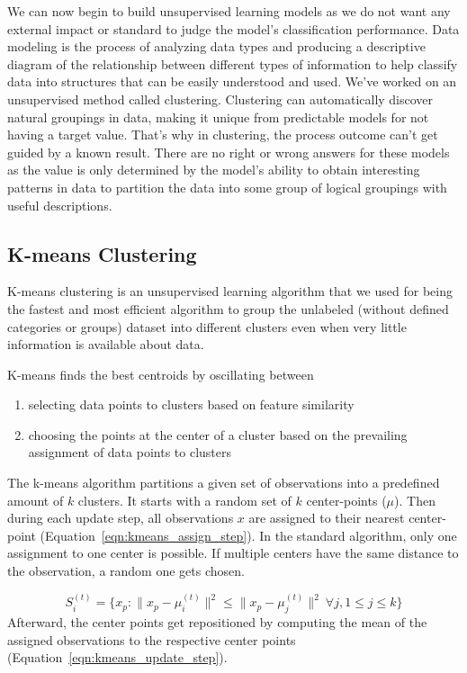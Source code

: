 \documentclass{swfuthesise}
\begin{document}
We can now begin to build unsupervised learning models as we do not want any external impact or standard to judge the model's classification performance. Data modeling is the process of analyzing data types and producing a descriptive diagram of the relationship between different types of information to help classify data into structures that can be easily understood and used. We've worked on an unsupervised method called clustering. Clustering can automatically discover natural groupings in data, making it unique from predictable models for not having a target value. That's why in clustering, the process outcome can't get guided by a known result. There are no right or wrong answers for these models as the value is only determined by the model's ability to obtain interesting patterns in data to partition the data into some group of logical groupings with useful descriptions.

\subsection{K-means Clustering}

K-means clustering is an unsupervised learning algorithm that we used for being the
fastest and most efficient algorithm to group the unlabeled (without defined categories or
groups) dataset into different clusters even when very little information is available
about data.

K-means finds the best centroids by oscillating between 
\begin{enumerate}
\item selecting data points to clusters based on feature similarity
\item choosing the points at the center of a cluster based on the prevailing assignment of
  data points to clusters
\end{enumerate}
    
The k-means algorithm partitions a given set of observations into a predefined amount of $k$ clusters. It starts with a random set of $k$ center-points ($\mu$). Then during each update step, all observations $x$ are assigned to their nearest center-point (Equation~\ref{eqn:kmeans_assign_step}). In the standard algorithm, only one assignment to one center is possible. If multiple centers have the same distance to the observation, a random one gets chosen.

\begin{equation}
S_i^{(t)} = \big \{ x_p : \big \| x_p - \mu^{(t)}_i \big \|^2 \le \big \| x_p - \mu^{(t)}_j \big \|^2 \ \forall j, 1 \le j \le k \big\}
\label{eqn:kmeans_assign_step}
\end{equation}
Afterward, the center points get repositioned by computing the mean of the assigned observations to the respective center points (Equation~\ref{eqn:kmeans_update_step}).
\end{document}
